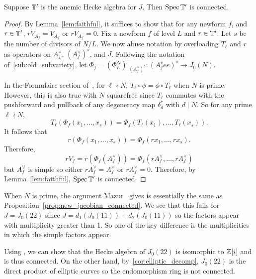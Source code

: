 \begin{proposition}
    Suppose $\mathbb{T}'$ is the anemic Hecke algebra for $J$. Then $\operatorname{Spec}\mathbb{T}'$ is
    connected.
\end{proposition}
\begin{proof}
    By Lemma~\ref{lem:faithful}, it suffices to show that for any newform $f$,
    and $r\in \mathbb{T}'$, $rV_{A_f}=V_{A_f}$ or $rV_{A_f}=0$. Fix a newform $f$ of
    level $L$ and $r\in \mathbb{T}'$. Let $s$ be the number of divisors of $N/L$. We
    now abuse notation by overloading $T_\ell$ and $r$ as operators on $A_f
    ^\vee$, $(A_f ^\vee)^s$, and $J$. Following the notation
    of~\ref{sub:old_subvariety}, let $\Phi_f = (\Phi_L ^N) |_{(A_f ^\vee)^s}:
    (A_f ^vee)^s \to J_0(N)$.

    In the Formulaire section of~\cite{ribet:old}, for $\ell\nmid N$,
    $T_\ell\circ \phi=\phi\circ T_\ell$ when $N$ is prime. However, this is
    also true with $N$ squarefree since $T_\ell$ commutes with the pushforward
    and pullback of any degeneracy map $\delta_d ^*$ with $d\mid N$. So for any
    prime $\ell\nmid N$,
    \[
        T_\ell(\Phi_f(x_1,\ldots,x_s))
        = \Phi_f(T_\ell(x_1),\ldots,T_\ell(x_s)).
    \]
    It follows that
    \[
        r(\Phi_f(x_1,\ldots,x_s))
        = \Phi_f(rx_1,\ldots,rx_s).
    \]
    Therefore,
    \[
        rV_f = r(\Phi_f(A_f ^\vee)) = \Phi_f(rA_f^\vee,\ldots,rA_f^\vee)
    \]
    but $A_f ^\vee$ is simple so either $rA_f ^\vee=A_f ^\vee$ or $rA_f
    ^\vee=0$. Therefore, by Lemma~\ref{lem:faithful}, $\operatorname{Spec}\mathbb{T}'$ is connected.
\end{proof}

\begin{example}
    When $N$ is prime, the argument Mazur~\cite[Prop. 10.6]{mazur:eisenstein}
    gives is essentially the same as
    Proposition~\ref{prop:new_jacobian_connected}. We see that this fails for
    $J=J_0(22)$ since $J=d_1(J_0(11))+d_2(J_0(11))$ so the factors appear with
    multiplicity greater than 1. So one of the key difference is the
    multiplicities in which the simple factors appear.

    Using \sage, we can show that the Hecke algebra of $J_0(22)$ is isomorphic
    to $\mathbb{Z}[i]$ and is thus connected. On the other hand,
    by~\ref{cor:elliptic_decomp}, $J_0(22)$ is the direct product of elliptic
    curves so the endomorphism ring is not connected.
\end{example}




